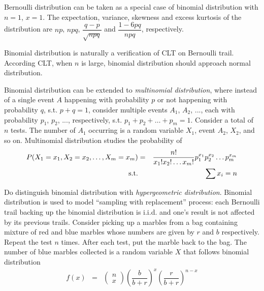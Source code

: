 Bernoulli distribution can be taken as a special case of binomial distribution with $n=1$, $x=1$. The expectation, variance, skewness and excess kurtosis of the distribution are $np$, $npq$, $\dfrac{q-p}{\sqrt{npq}}$ and $\dfrac{1-6pq}{npq}$, respectively.

Binomial distribution is naturally a verification of CLT on Bernoulli trail. According CLT, when $n$ is large, binomial distribution should approach normal distribution.

Binomial distribution can be extended to \textit{multinomial distribution}, where instead of a single event $A$ happening with probability $p$ or not happening with probability $q$, s.t. $p+q=1$, consider multiple events $A_1$, $A_2$, ..., each with probability $p_1$, $p_2$, ..., respectively, s.t. $p_1+p_2+\ldots+p_m=1$. Consider a total of $n$ tests. The number of $A_1$ occurring is a random variable $X_1$, event $A_2$, $X_2$, and so on. Multinomial distribution studies the probability of
\begin{eqnarray}
  P(X_1=x_1, X_2=x_2,\ldots, X_m = x_m) &=& \dfrac{n!}{x_1!x_2!\ldots x_m!}p_1^{x_1}p_2^{x_2}\ldots p_m^{x_m} \nonumber \\
  \textup{s.t.} && \sum x_i = n \nonumber
\end{eqnarray}

Do distinguish binomial distribution with \textit{hypergeometric distribution}. Binomial distribution is used to model ``sampling with replacement'' process: each Bernoulli trail backing up the binomial distribution is i.i.d. and one's result is not affected by its previous trails. Consider picking up a marbles from a bag containing mixture of red and blue marbles whose numbers are given by $r$ and $b$ respectively. Repeat the test $n$ times. After each test, put the marble back to the bag. The number of blue marbles collected is a random variable $X$ that follows binomial distribution
\begin{eqnarray}
f(x) &=& \left(\begin{array}{c}
                        n \\
                        x
                      \end{array}\right)\left(\dfrac{b}{b+r}\right)^x\left(\dfrac{r}{b+r}\right)^{n-x} \nonumber \nonumber
\end{eqnarray}

